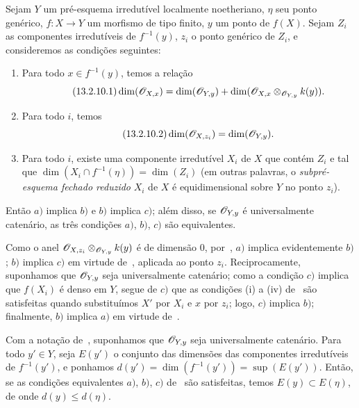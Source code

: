 \begin{proposition}[13.2.10]
\label{IV.13.2.10}
Sejam $Y$ um pré-esquema irredutível localmente noetheriano, $\eta$ seu ponto
genérico, $f:X\to Y$ um morfismo de tipo finito, $y$ um ponto de $f(X)$.
Sejam $Z_i$ as
componentes irredutíveis de $f^{-1}(y)$, $z_i$ o ponto genérico de $Z_i$, e
consideremos as condições seguintes:
\begin{enumerate}[label=\emph{\alph*)}]
  \item Para todo $x\in f^{-1}(y)$, temos a relação
  \[
  \tag{13.2.10.1}
\label{IV.13.2.10.1}
    \dim(\sh{O}_{X,x})=\dim(\sh{O}_{Y,y})+\dim(\sh{O}_{X,x}\otimes_{\sh{O}_{Y,y}}k(y)).
  \]
  \item Para todo $i$, temos
  \[
  \label{IV.13.2.10.2}
\tag{13.2.10.2}
    \dim(\sh{O}_{X,z_i})=\dim(\sh{O}_{Y,y}).
  \]
  \item Para todo $i$, existe uma componente irredutível $X_i$ de $X$ que
  contém $Z_i$ e tal que $\dim(X_i\cap f^{-1}(\eta))=\dim(Z_i)$
  (em outras palavras, o \emph{subpré-esquema fechado reduzido} $X_i$ de $X$
  é equidimensional sobre $Y$ no ponto $z_i$).
\end{enumerate}
Então $a)$ implica $b)$ e $b)$ implica $c)$; além disso, se $\mathscr{O}_{Y,y}$
é universalmente catenário, as três condições $a)$, $b)$, $c)$ são equivalentes.
\end{proposition}

Como o anel $\mathscr{O}_{X,z_i}\otimes_{\mathscr{O}_{Y,y}}k(y)$ é de dimensão $0$,
por~, $a)$ implica evidentemente $b)$; $b)$ implica $c)$ em
virtude de~, aplicada ao ponto $z_i$.
Reciprocamente, suponhamos que $\mathscr{O}_{Y,y}$ seja universalmente catenário;
como a condição $c)$ implica que $f(X_i)$ é denso em $Y$, segue de $c)$ que
as condições (i) a (iv) de~ são satisfeitas quando
substituímos $X'$ por $X_i$ e $x$ por $z_i$; logo, $c)$ implica $b)$;
finalmente, $b)$ implica $a)$ em virtude de~.

\begin{corollary}[13.2.11]
\label{IV.13.2.11}
Com a notação de~, suponhamos que $\mathscr{O}_{Y,y}$ seja
universalmente catenário.
Para todo $y'\in Y$, seja $E(y')$ o conjunto das dimensões das componentes
irredutíveis de $f^{-1}(y')$, e ponhamos
$d(y')=\dim(f^{-1}(y'))=\sup(E(y'))$.
Então, se as condições equivalentes $a)$, $b)$, $c)$ de~
são satisfeitas, temos $E(y)\subset E(\eta)$, de onde $d(y)\leq d(\eta)$.
\end{corollary}

